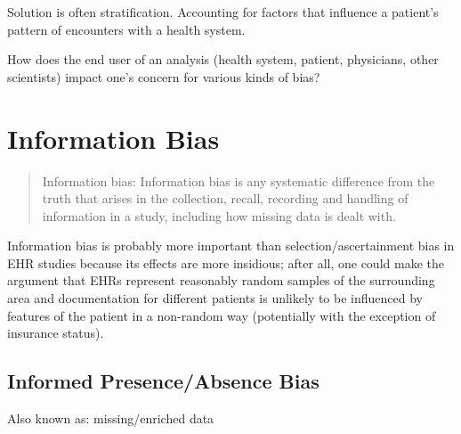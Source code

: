 Solution is often stratification. Accounting for factors that influence a patient's pattern of encounters with a health system. 

\begin{question}{}
How does the end user of an analysis (health system, patient, physicians, other scientists) impact one's concern for various kinds of bias? 
\end{question}



\section{Information Bias}

\begin{quote}
Information bias: Information bias is any systematic difference from the truth that arises in the collection, recall, recording and handling of information in a study, including how missing data is dealt with.
\end{quote}

Information bias is probably more important than selection/ascertainment bias in EHR studies because its effects are more insidious; after all, one could make the argument that EHRs represent reasonably random samples of the surrounding area and documentation for different patients is unlikely to be influenced by features of the patient in a non-random way (potentially with the exception of insurance status). 


\subsection{Informed Presence/Absence Bias}

Also known as: missing/enriched data 


